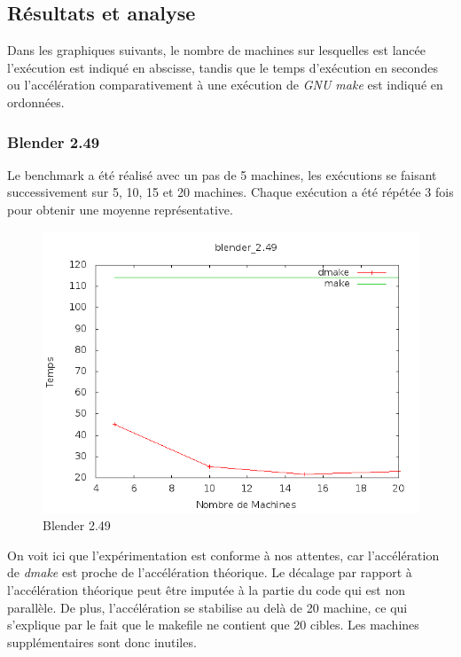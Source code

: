 \documentclass[a4paper,12pt,twoside]{article}
\begin{document}
\subsection{Résultats et analyse}

Dans les graphiques suivants, le nombre de machines sur lesquelles est
lancée l'exécution est indiqué en abscisse, tandis que le temps
d'exécution en secondes ou l'accélération comparativement à une
exécution de \emph{GNU make} est indiqué en ordonnées.

\subsubsection{Blender 2.49}

Le benchmark a été réalisé avec un pas de 5 machines, les exécutions
se faisant successivement sur 5, 10, 15 et 20 machines. Chaque
exécution a été répétée 3 fois pour obtenir une moyenne
représentative.

\begin{figure}[H]
  \centering
  \includegraphics[scale=0.5]{benchmark_blender_2_49_01.png}
  \caption{Blender 2.49}
  \label{fig:blender249}
\end{figure}

On voit ici que l'expérimentation est conforme à nos attentes, car
l'accélération de \emph{dmake} est proche de l'accélération
théorique. Le décalage par rapport à l'accélération théorique peut
être imputée à la partie du code qui est non parallèle. De plus,
l'accélération se stabilise au delà de 20 machine, ce qui s'explique
par le fait que le makefile ne contient que 20 cibles. Les machines
supplémentaires sont donc inutiles. 
\end{document}
